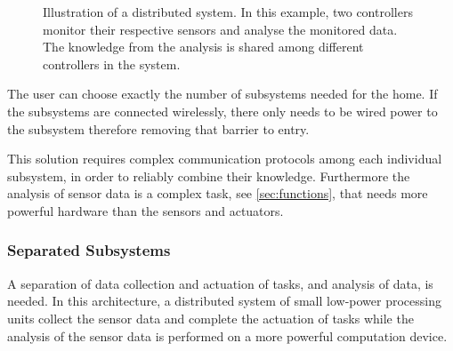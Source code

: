 \begin{figure}[htbp]
\centering
{}
\caption[Distributed system]{Illustration of a distributed system. In this example, two controllers monitor their respective sensors and analyse the monitored data. The knowledge from the analysis is shared among different controllers in the system.}\label{fig:distributed_system}
\end{figure}

The user can choose exactly the number of subsystems needed for the home. If the subsystems are connected wirelessly, there only needs to be wired power to the subsystem therefore removing that barrier to entry.

This solution requires complex communication protocols among each individual subsystem, in order to reliably combine their knowledge. Furthermore the analysis of sensor data is a complex task, see \cref{sec:functions}, that needs more powerful hardware than the sensors and actuators.

\subsubsection{Separated Subsystems}
A separation of data collection and actuation of tasks, and analysis of data, is needed. In this architecture, a distributed system of small low-power processing units collect the sensor data and complete the actuation of tasks while the analysis of the sensor data is performed on a more powerful computation device.

